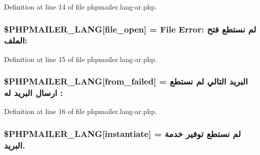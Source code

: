 Definition at line 14 of file phpmailer.\+lang-\/ar.\+php.

\subsubsection[{\texorpdfstring{\$\+P\+H\+P\+M\+A\+I\+L\+E\+R\+\_\+\+L\+A\+NG}{$PHPMAILER_LANG}}]{\setlength{\rightskip}{0pt plus 5cm}\$P\+H\+P\+M\+A\+I\+L\+E\+R\+\_\+\+L\+A\+NG\mbox{[}\textquotesingle{}file\+\_\+open\textquotesingle{}\mbox{]} = \textquotesingle{}File Error\+: لم نستطع فتح الملف\+: \textquotesingle{}}\hypertarget{phpmailer_8lang-ar_8php_a28d1a6517bf4c942a0ddd506188ad2e0}{}\label{phpmailer_8lang-ar_8php_a28d1a6517bf4c942a0ddd506188ad2e0}


Definition at line 15 of file phpmailer.\+lang-\/ar.\+php.

\subsubsection[{\texorpdfstring{\$\+P\+H\+P\+M\+A\+I\+L\+E\+R\+\_\+\+L\+A\+NG}{$PHPMAILER_LANG}}]{\setlength{\rightskip}{0pt plus 5cm}\$P\+H\+P\+M\+A\+I\+L\+E\+R\+\_\+\+L\+A\+NG\mbox{[}\textquotesingle{}from\+\_\+failed\textquotesingle{}\mbox{]} = \textquotesingle{}البريد التالي لم نستطع ارسال البريد له \+: \textquotesingle{}}\hypertarget{phpmailer_8lang-ar_8php_adf832ae12155a09be077c6d5e4fd7e22}{}\label{phpmailer_8lang-ar_8php_adf832ae12155a09be077c6d5e4fd7e22}


Definition at line 16 of file phpmailer.\+lang-\/ar.\+php.

\subsubsection[{\texorpdfstring{\$\+P\+H\+P\+M\+A\+I\+L\+E\+R\+\_\+\+L\+A\+NG}{$PHPMAILER_LANG}}]{\setlength{\rightskip}{0pt plus 5cm}\$P\+H\+P\+M\+A\+I\+L\+E\+R\+\_\+\+L\+A\+NG\mbox{[}\textquotesingle{}instantiate\textquotesingle{}\mbox{]} = \textquotesingle{}لم نستطع توفير خدمة البريد.\textquotesingle{}}\hypertarget{phpmailer_8lang-ar_8php_ad58dde16780f4770ccf4dd282ea1f5ad}{}\label{phpmailer_8lang-ar_8php_ad58dde16780f4770ccf4dd282ea1f5ad}


